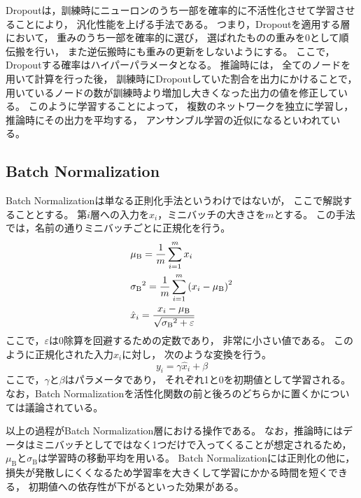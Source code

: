 \documentclass[class=jsarticle, crop=false, dvipdfmx, fleqn]{standalone}
\begin{document}
Dropoutは，訓練時にニューロンのうち一部を確率的に不活性化させて学習させることにより，
汎化性能を上げる手法である。
つまり，Dropoutを適用する層において，
重みのうち一部を確率的に選び，
選ばれたものの重みを0として順伝搬を行い，
また逆伝搬時にも重みの更新をしないようにする。
ここで，Dropoutする確率はハイパーパラメータとなる。
推論時には，
全てのノードを用いて計算を行った後，
訓練時にDropoutしていた割合を出力にかけることで，
用いているノードの数が訓練時より増加し大きくなった出力の値を修正している。
このように学習することによって，
複数のネットワークを独立に学習し，
推論時にその出力を平均する，
アンサンブル学習の近似になるといわれている。



\subsection{Batch Normalization}

Batch Normalizationは単なる正則化手法というわけではないが，
ここで解説することとする。
第$i$層への入力を$x_i$，ミニバッチの大きさを$m$とする。
この手法では，名前の通りミニバッチごとに正規化を行う。
\begin{align}
& \mu_\mathrm{B} = \frac{1}{m} \sum_{i=1}^{m} x_i \\
& {\sigma_\mathrm{B}}^2 = \frac{1}{m} \sum_{i=1}^m \qty(x_i - \mu_\mathrm{B})^2 \\
& \hat{x}_i = \frac{x_i - \mu_\mathrm{B}}{\sqrt{{\sigma_\mathrm{B}}^2 + \varepsilon}}
\end{align}
ここで，$\varepsilon$は0除算を回避するための定数であり，
非常に小さい値である。
このように正規化された入力$\hat{x}_i$に対し，
次のような変換を行う。
\begin{equation}
y_i = \gamma \hat{x}_i + \beta
\end{equation}
ここで，$\gamma$と$\beta$はパラメータであり，
それぞれ1と0を初期値として学習される。
なお，Batch Normalizationを活性化関数の前と後ろのどちらかに置くかについては議論されている。

以上の過程がBatch Normalization層における操作である。
なお，推論時にはデータはミニバッチとしてではなく1つだけで入ってくることが想定されるため，
$\mu_\mathrm{B}$と$\sigma_\mathrm{B}$は学習時の移動平均を用いる。
Batch Normalizationには正則化の他に，
損失が発散しにくくなるため学習率を大きくして学習にかかる時間を短くできる，
初期値への依存性が下がるといった効果がある。
\end{document}
